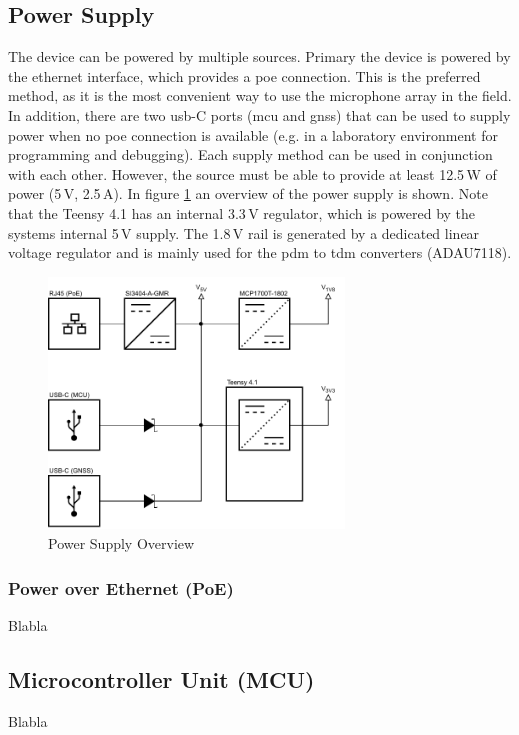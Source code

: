 \subsection{Power Supply}
The device can be powered by multiple sources.
Primary the device is powered by the ethernet interface, which provides a \acrfull{poe} connection.
This is the preferred method, as it is the most convenient way to use the microphone array in the field.
In addition, there are two \acrshort{usb}-C ports (\acrshort{mcu} and \acrshort{gnss}) that can be used to supply power when no \acrshort{poe} connection is available (e.g. in a laboratory environment for programming and debugging).
Each supply method can be used in conjunction with each other. However, the source must be able to provide at least 12.5\,W of power (5\,V, 2.5\,A).
In figure \ref{fig:power_supply_overview} an overview of the power supply is shown.
Note that the Teensy 4.1 has an internal 3.3\,V regulator, which is powered by the systems internal 5\,V supply.
The 1.8\,V rail is generated by a dedicated linear voltage regulator and is mainly used for the \acrshort{pdm} to \acrshort{tdm} converters (ADAU7118).
\begin{figure}[h]
	\centering
	\includegraphics[width=0.7\textwidth]{images/6_design_final/final_design_power_supply.pdf}
	\caption{Power Supply Overview}
	\label{fig:power_supply_overview}
\end{figure}

\subsubsection{Power over Ethernet (PoE)}
Blabla

\subsection{Microcontroller Unit (MCU)}
Blabla

